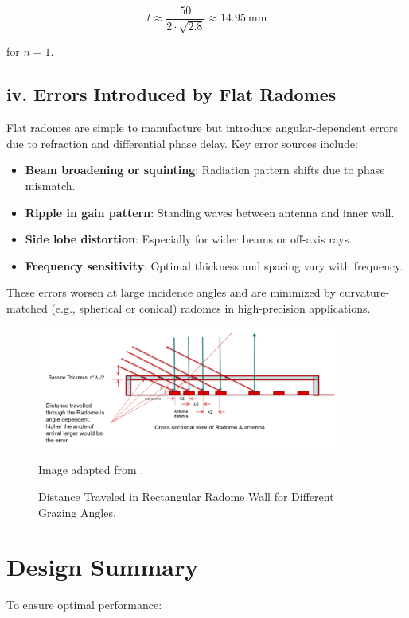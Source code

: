 \[
t \approx \frac{50}{2 \cdot \sqrt{2.8}} \approx 14.95~\mathrm{mm}
\]

for $n = 1$.

\subsection*{iv. Errors Introduced by Flat Radomes}

Flat radomes are simple to manufacture but introduce angular-dependent errors due to refraction and differential phase delay. Key error sources include:

\begin{itemize}
    \item \textbf{Beam broadening or squinting}: Radiation pattern shifts due to phase mismatch.
    \item \textbf{Ripple in gain pattern}: Standing waves between antenna and inner wall.
    \item \textbf{Side lobe distortion}: Especially for wider beams or off-axis rays.
    \item \textbf{Frequency sensitivity}: Optimal thickness and spacing vary with frequency.
\end{itemize}

These errors worsen at large incidence angles and are minimized by curvature-matched (e.g., spherical or conical) radomes in high-precision applications.

\begin{figure}[H]
    \centering
    \includegraphics[width=0.9\textwidth]{figures/flat.png}
    \caption{Distance Traveled in Rectangular Radome Wall for Different Grazing Angles.}
    \small Image adapted from \cite{swra705}.
    \label{fig:radome-grazing-angle}
\end{figure}

\section{Design Summary}

To ensure optimal performance:


